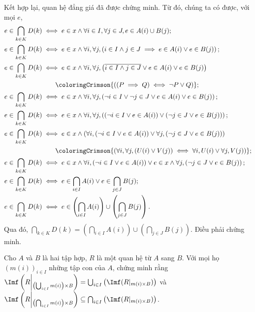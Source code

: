 Kết hợp lại, quan hệ đẳng giá đã được chứng minh. Từ đó, chúng ta có được, với mọi $e$,
\begin{align*}
   e \in \bigcap_{k \in K} D(k) &\iff e \in x \land \forall i \in I, \forall j \in J, e \in A(i) \cup B(j); \\
   e \in \bigcap_{k \in K} D(k) &\iff e \in x \land \forall i, \forall j, \left(i \in I \land j \in J \implies e \in A(i) \lor e \in B(j)\right); \\
   e \in \bigcap_{k \in K} D(k) &\iff e \in x \land \forall i, \forall j, \left(\overline{i \in I \land j \in J} \lor e \in A(i) \lor e \in B(j)\right) \\
   &\qquad\coloringCrimson{\left((P \implies Q) \iff \neg P \lor Q\right)}; \\
   e \in \bigcap_{k \in K} D(k) &\iff e \in x \land \forall i, \forall j, \left(\neg i \in I \lor \neg j \in J \lor e \in A(i) \lor e \in B(j)\right); \\
   e \in \bigcap_{k \in K} D(k) &\iff e \in x \land \forall i, \forall j, \left( \left(\neg i \in I \lor e \in A(i)\right) \lor \left(\neg j \in J \lor e \in B(j)\right) \right); \\
   e \in \bigcap_{k \in K} D(k) &\iff e \in x \land \left(\forall i, \left(\neg i \in I \lor e \in A(i)\right) \lor \forall j, \left(\neg j \in J \lor e \in B(j)\right) \right) \\
   &\qquad\coloringCrimson{\left(\forall i, \forall j, (U(i) \lor V(j)) \iff \forall i, U(i) \lor \forall j, V(j)\right)}; \\
   e \in \bigcap_{k \in K} D(k) &\iff e \in x \land \forall i, \left(\neg i \in I \lor e \in A(i)\right) \lor e \in x \land \forall j, \left(\neg j \in J \lor e \in B(j)\right); \\
   e \in \bigcap_{k \in K} D(k) &\iff e \in \bigcap_{i \in I} A(i) \lor e \in \bigcap_{j \in J} B(j); \\
   e \in \bigcap_{k \in K} D(k) &\iff e \in \left(\bigcap_{i \in I} A(i)\right) \cup \left(\bigcap_{j \in J} B(j)\right).
\end{align*}
Qua đó, $\bigcap_{k \in K} D(k) = \left(\bigcap_{i \in I} A(i)\right) \cup \left(\bigcap_{j \in J} B(j)\right)$. Điều phải chứng minh.

\exercise Cho $A$ và $B$ là hai tập hợp, $R$ là một quan hệ từ $A$ sang $B$. Với mọi họ $(m(i))_{i \in I}$ những tập con của $A$, chứng minh rằng $\Imf \left(R\middle|_{\left(\bigcup_{i \in I}m(i)\right) \times B} \right) = \bigcup_{i \in I} \left(\Imf(R|_{m(i) \times B})\right)$ và $\Imf \left(R\middle|_{\left(\bigcap_{i \in I}m(i)\right) \times B} \right) \subseteq \bigcap_{i \in I} \left(\Imf(R|_{m(i) \times B})\right)$.

